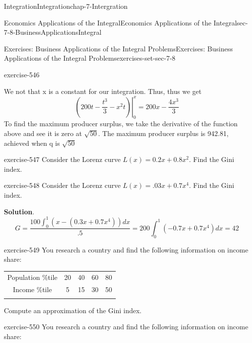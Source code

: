 \documentclass[oneside,10pt,]{book}
\numberwithin{equation}{section}
\newcommand{\hrulethin}  {\noalign{\hrule height 0.04em}}
\newcommand{\hrulemedium}{\noalign{\hrule height 0.07em}}
\newcommand{\hrulethick} {\noalign{\hrule height 0.11em}}
\begin{document}
\begin{chapterptx}{Integration}{}{Integration}{}{}{chap-7-Intergration}
\begin{sectionptx}{Economics Applications of the Integral}{}{Economics Applications of the Integral}{}{}{sec-7-8-BusinessApplicationsIntegral}
\begin{exercises-subsection-numberless}{Exercises: Business Applications of the Integral Problems}{}{Exercises: Business Applications of the Integral Problems}{}{}{exercises-set-sec-7-8}
\begin{divisionexercise}{9}{}{}{exercise-546}
\begin{enumerate}[label=(\alph*)]
\hypertarget{p-3156}{}%
We not that x is a constant for our integration.  Thus, thus we get%
%
\begin{equation*}
\left.\left({200t-\frac{t^3}{3}-x^2t}\right)\right|_0^x=200x-\frac{4x^3}{3}
\end{equation*}
\hypertarget{p-3157}{}%
To find the maximum producer surplus, we take the derivative of the function above and see it is zero at \(\sqrt{50}\).  The maximum producer surplus is 942.81, achieved when q is \(\sqrt{50}\)%
\end{enumerate}
\end{divisionexercise}%
\begin{divisionexercise}{10}{}{}{exercise-547}%
\hypertarget{p-3158}{}%
Consider the Lorenz curve \(L(x)=0.2x+0.8x^2\).  Find the Gini index.%
\end{divisionexercise}%
\begin{divisionexercise}{11}{}{}{exercise-548}%
\hypertarget{p-3159}{}%
Consider the Lorenz curve \(L(x)=.03x+0.7x^4\).  Find the Gini index.%
\par\smallskip%
\noindent\textbf{Solution}.\hypertarget{solution-277}{}\quad%
%
\begin{equation*}
G=\frac{100 \int_0^1(x-(0.3x+0.7x^4))dx}{.5}
=200 \int_0^1(-0.7x+0.7x^4)dx=42
\end{equation*}
\end{divisionexercise}%
\begin{divisionexercise}{12}{}{}{exercise-549}%
\hypertarget{p-3160}{}%
You research a country and find the following information on income share:%
\begin{sidebyside}{1}{0}{0}{0}%
\begin{sbspanel}{1}%
{\centering%
\begin{tabular}{ccccc}\hrulethick
Population \%tile&20&40&60&80\tabularnewline\hrulethin
Income \%tile&5&15&30&50\tabularnewline\hrulemedium
\end{tabular}
\par}
\end{sbspanel}%
\end{sidebyside}%
\par
\hypertarget{p-3161}{}%
Compute an approximation of the Gini index.%
\end{divisionexercise}%
\begin{divisionexercise}{13}{}{}{exercise-550}%
\hypertarget{p-3162}{}%
You research a country and find the following information on income share:%
\begin{sidebyside}{1}{0}{0}{0}%
\begin{sbspanel}{1}%

\end{sbspanel}
\end{sidebyside}
\end{divisionexercise}
\end{exercises-subsection-numberless}
\end{sectionptx}
\end{chapterptx}
\end{document}
